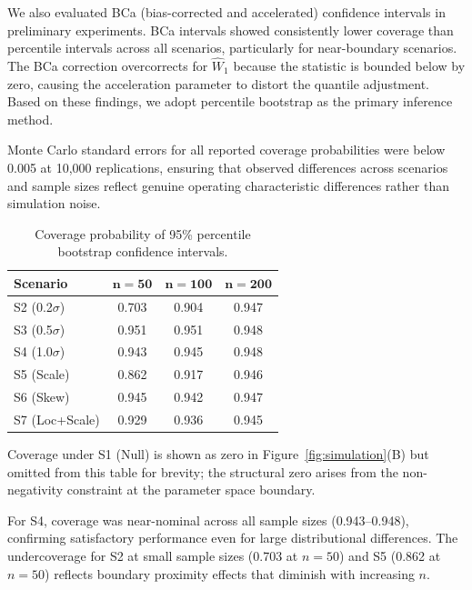 \documentclass[AMA,Times1COL]{WileyNJDv5}
\begin{document}
We also evaluated BCa (bias-corrected and accelerated) confidence intervals in preliminary experiments. BCa intervals showed consistently lower coverage than percentile intervals across all scenarios, particularly for near-boundary scenarios. The BCa correction overcorrects for $\widehat{W}_1$ because the statistic is bounded below by zero, causing the acceleration parameter to distort the quantile adjustment. Based on these findings, we adopt percentile bootstrap as the primary inference method.

Monte Carlo standard errors for all reported coverage probabilities were below 0.005 at 10{,}000 replications, ensuring that observed differences across scenarios and sample sizes reflect genuine operating characteristic differences rather than simulation noise.

\begin{table}[ht]
\centering
\caption{Coverage probability of 95\% percentile bootstrap confidence intervals.\label{tab:coverage}}
\begin{tabular}{lccc}
\toprule
\textbf{Scenario} & $\boldsymbol{n=50}$ & $\boldsymbol{n=100}$ & $\boldsymbol{n=200}$ \\
\midrule
S2 (0.2$\sigma$) & 0.703 & 0.904 & 0.947 \\
S3 (0.5$\sigma$) & 0.951 & 0.951 & 0.948 \\
S4 (1.0$\sigma$) & 0.943 & 0.945 & 0.948 \\
S5 (Scale) & 0.862 & 0.917 & 0.946 \\
S6 (Skew) & 0.945 & 0.942 & 0.947 \\
S7 (Loc+Scale) & 0.929 & 0.936 & 0.945 \\
\bottomrule
\end{tabular}
\begin{tablenotes}
\item Coverage under S1 (Null) is shown as zero in Figure~\ref{fig:simulation}(B) but omitted from this table for brevity; the structural zero arises from the non-negativity constraint at the parameter space boundary.
\item For S4, coverage was near-nominal across all sample sizes (0.943--0.948), confirming satisfactory performance even for large distributional differences. The undercoverage for S2 at small sample sizes (0.703 at $n=50$) and S5 (0.862 at $n=50$) reflects boundary proximity effects that diminish with increasing $n$.
\end{tablenotes}
\end{table}
\end{document}
